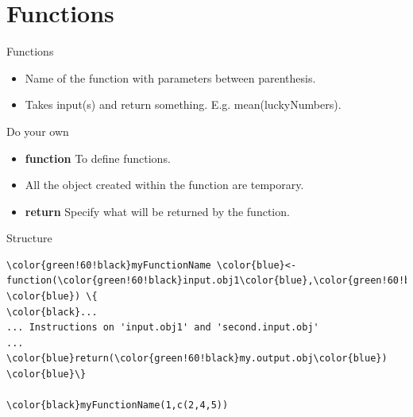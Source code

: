 \documentclass[10pt]{beamer}
\begin{document}







\section{Functions}


\begin{frame}[fragile]{Functions}
  \begin{block}{}
    \begin{itemize}
    \item Name of the function with parameters between parenthesis.
    \item Takes input(s) and return something. E.g. {\sf mean(luckyNumbers)}.
    \end{itemize}
  \end{block}
  \begin{block}{Do your own}
    \begin{itemize}
      \item{\bf\sf function} To define functions.
      \item All the object created within the function are temporary.
      \item{\bf\sf return} Specify what will be returned by the function. 
    \end{itemize}
  \end{block}
  \begin{block}{Structure}    
    \begin{Verbatim}[commandchars=\\\{\}]
\color{green!60!black}myFunctionName \color{blue}<- function(\color{green!60!black}input.obj1\color{blue},\color{green!60!black}second.input.obj \color{blue}) \{
\color{black}...
... Instructions on 'input.obj1' and 'second.input.obj'
...
\color{blue}return(\color{green!60!black}my.output.obj\color{blue})
\color{blue}\}
  
\color{black}myFunctionName(1,c(2,4,5))
    \end{Verbatim}
  \end{block}
\end{frame}
\end{document}
